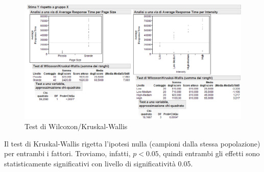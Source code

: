 		\begin{figure}[H]
			\centering
			\includegraphics[scale=0.6]{./immagine/StimaYrispettoaX.png}
			\caption{Test di Wilcoxon/Kruskal-Wallis}
			\label{fig:doe-yx}
		\end{figure}
	
		Il test di Kruskal-Wallis rigetta l'ipotesi nulla (campioni dalla stessa popolazione) per entrambi i fattori. Troviamo, infatti, $p<0.05$, quindi entrambi gli effetti sono statisticamente significativi con livello di significatività 0.05.
	